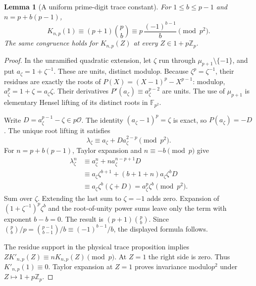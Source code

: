 \documentclass[11pt]{article}
\newtheorem{lemma}{Lemma}\newtheorem{theorem}[lemma]{Theorem}
\begin{document}
\begin{lemma}[A uniform prime-digit trace constant]\label{lem:prime-digit-constant}
For $1\le b\le p-1$ and $n=p+b(p-1)$,
\[
 K_{n,p}(1)\equiv(p+1)\binom pb
           \equiv p\,\frac{(-1)^{b-1}}b\pmod{p^2}.
\]
The same congruence holds for $K_{n,p}(Z)$ at every
$Z\in1+p\mathbb Z_p$.
\end{lemma}
\begin{proof}
In the unramified quadratic extension, let $\zeta$ run through
$\mu_{p+1}\setminus\{-1\}$, and put $a_\zeta=1+\zeta^{-1}$.
These are units, distinct modulo$p$.
Because $\zeta^p=\zeta^{-1}$, their residues are exactly the roots
of $P(X)=(X-1)^p-X^{p-1}$: modulo$p$,
$a_\zeta^p=1+\zeta=a_\zeta\zeta$.
Their derivatives $P'(a_\zeta)\equiv a_\zeta^{p-2}$ are units.
The use of $\mu_{p+1}$ is elementary Hensel lifting of its distinct
roots in $\mathbb F_{p^2}$.

Write $D=a_\zeta^{p-1}-\zeta\in p\mathcal O$.
The identity $(a_\zeta-1)^p=\zeta$ is exact, so
$P(a_\zeta)=-D$.
The unique root lifting it satisfies
\[
 \lambda_\zeta\equiv a_\zeta+D a_\zeta^{2-p}\pmod{p^2}.
\]
For $n=p+b(p-1)$, Taylor expansion and $n\equiv-b\pmod p$ give
\[
\begin{split}
 \lambda_\zeta^n
 &\equiv a_\zeta^n+n a_\zeta^{n-p+1}D\\
 &\equiv a_\zeta\zeta^{b+1}
       +(b+1+n)a_\zeta\zeta^bD\\
 &\equiv a_\zeta\zeta^b(\zeta+D)
  =a_\zeta^p\zeta^b \pmod{p^2}.
\end{split}
\]
Sum over $\zeta$. Extending the last sum to $\zeta=-1$ adds zero.
Expansion of $(1+\zeta^{-1})^p\zeta^b$ and the root-of-unity
power sums leave only the term with exponent $b-b=0$.
The result is $(p+1)\binom pb$.
Since
$\binom pb/p=\binom{p-1}{b-1}/b\equiv(-1)^{b-1}/b$,
the displayed formula follows.

The residue support in the physical trace proposition implies
$ZK'_{n,p}(Z)\equiv nK_{n,p}(Z)\pmod p$.
At $Z=1$ the right side is zero. Thus $K'_{n,p}(1)\equiv0$.
Taylor expansion at $Z=1$ proves invariance modulo$p^2$
under $Z\mapsto1+p\mathbb Z_p$.
\end{proof}
\end{document}

